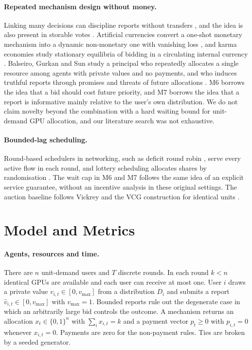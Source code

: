 \documentclass{article}
\theoremstyle{plain}
\theoremstyle{definition}
\newcommand{\vmax}{v_{\max}}
\begin{document}
\paragraph{Repeated mechanism design without money.}
Linking many decisions can discipline reports without transfers \cite{jackson2007linking}, and the idea is also present in storable votes \cite{casella2005storable}.
Artificial currencies convert a one-shot monetary mechanism into a dynamic non-monetary one with vanishing loss \cite{gorokh2021artificial}, and karma economies study stationary equilibria of bidding in a circulating internal currency \cite{elokda2024karma}.
Balseiro, Gurkan and Sun study a principal who repeatedly allocates a single resource among agents with private values and no payments, and who induces truthful reports through promises and threats of future allocations \cite{balseiro2019multiagent}.
M6 borrows the idea that a bid should cost future priority, and M7 borrows the idea that a report is informative mainly relative to the user's own distribution.
We do not claim novelty beyond the combination with a hard waiting bound for unit-demand GPU allocation, and our literature search was not exhaustive.

\paragraph{Bounded-lag scheduling.}
Round-based schedulers in networking, such as deficit round robin \cite{shreedhar1995drr}, serve every active flow in each round, and lottery scheduling allocates shares by randomisation \cite{waldspurger1994lottery}.
The wait cap in M6 and M7 follows the same idea of an explicit service guarantee, without an incentive analysis in these original settings.
The auction baseline follows Vickrey \cite{vickrey1961counterspeculation} and the VCG construction for identical units \cite{nisan2007agt}.

\section{Model and Metrics}
\label{sec:model}

\paragraph{Agents, resources and time.}
There are $n$ unit-demand users and $T$ discrete rounds.
In each round $k<n$ identical GPUs are available and each user can receive at most one.
User $i$ draws a private value $v_{i,t}\in[0,\vmax]$ from a distribution $D_i$ and submits a report $\hat v_{i,t}\in[0,\vmax]$ with $\vmax=1$.
Bounded reports rule out the degenerate case in which an arbitrarily large bid controls the outcome.
A mechanism returns an allocation $x_t\in\{0,1\}^n$ with $\sum_i x_{i,t}=k$ and a payment vector $p_t\ge 0$ with $p_{i,t}=0$ whenever $x_{i,t}=0$.
Payments are zero for the non-payment rules.
Ties are broken by a seeded generator.
\end{document}

